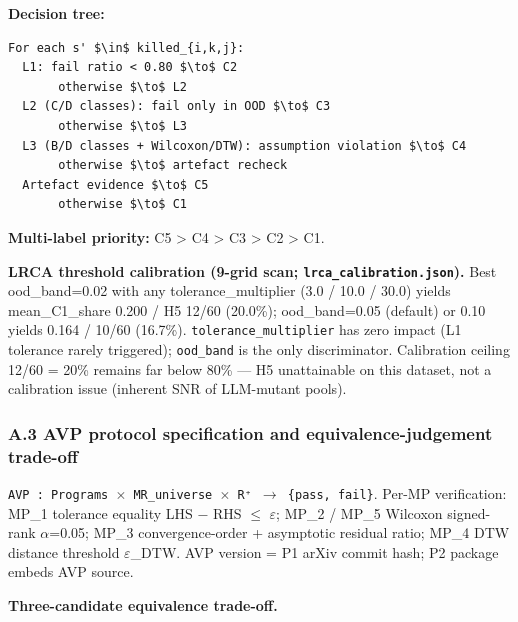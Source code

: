\documentclass[review,12pt,authoryear]{elsarticle}
\begin{document}
\textbf{Decision tree:}

\begin{verbatim}
For each s' $\in$ killed_{i,k,j}:
  L1: fail ratio < 0.80 $\to$ C2
       otherwise $\to$ L2
  L2 (C/D classes): fail only in OOD $\to$ C3
       otherwise $\to$ L3
  L3 (B/D classes + Wilcoxon/DTW): assumption violation $\to$ C4
       otherwise $\to$ artefact recheck
  Artefact evidence $\to$ C5
       otherwise $\to$ C1
\end{verbatim}

\textbf{Multi-label priority:} C5 \textgreater{} C4 \textgreater{} C3
\textgreater{} C2 \textgreater{} C1.

\textbf{LRCA threshold calibration (9-grid scan;
\texttt{lrca\_calibration.json}).} Best ood\_band=0.02 with any
tolerance\_multiplier (3.0 / 10.0 / 30.0) yields mean\_C1\_share 0.200 /
H5 12/60 (20.0\%); ood\_band=0.05 (default) or 0.10 yields 0.164 / 10/60
(16.7\%). \texttt{tolerance\_multiplier} has zero impact (L1 tolerance
rarely triggered); \texttt{ood\_band} is the only discriminator.
Calibration ceiling 12/60 = 20\% remains far below 80\% --- H5
unattainable on this dataset, not a calibration issue (inherent SNR of
LLM-mutant pools).

\subsubsection{A.3 AVP protocol specification and equivalence-judgement
trade-off}\label{a.3-avp-protocol-specification-and-equivalence-judgement-trade-off}

\texttt{AVP\ :\ Programs\ $\times$\ MR\_universe\ $\times$\ R⁺\ $\to$\ \{pass,\ fail\}}.
Per-MP verification: MP\_1 tolerance equality \textbar LHS −
RHS\textbar{} $\leq$ $\varepsilon$; MP\_2 / MP\_5 Wilcoxon signed-rank $\alpha$=0.05; MP\_3
convergence-order + asymptotic residual ratio; MP\_4 DTW distance
threshold $\varepsilon$\_DTW. AVP version = P1 arXiv commit hash; P2 package embeds
AVP source.

\textbf{Three-candidate equivalence trade-off.}
\end{document}
